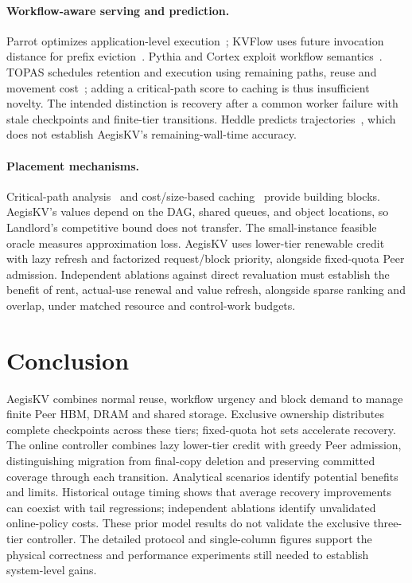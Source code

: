 \documentclass[sigplan,10pt,anonymous,nonacm]{acmart}
\begin{document}
\paragraph{Workflow-aware serving and prediction.}
Parrot optimizes application-level execution~\cite{lin2024parrot}; KVFlow
uses future invocation distance for prefix eviction~\cite{pan2025kvflow}.
Pythia and Cortex exploit workflow semantics~\cite{yu2026pythia,pagonas2025cortex}.
TOPAS schedules retention and execution using remaining paths, reuse and
movement cost~\cite{ni2026topas}; adding a critical-path score to caching
is thus insufficient novelty. The intended distinction is recovery after
a common worker failure with stale checkpoints and finite-tier transitions.
Heddle predicts trajectories~\cite{zhang2026heddle}, which does not establish
AegisKV's remaining-wall-time accuracy.

\paragraph{Placement mechanisms.}
Critical-path analysis~\cite{kelley1959cpm} and cost/size-based caching~\cite{young2002landlord}
provide building blocks. AegisKV's values depend on the DAG, shared queues,
and object locations, so Landlord's competitive bound does not transfer. The
small-instance feasible oracle measures approximation loss. AegisKV
uses lower-tier renewable credit with lazy refresh and factorized request/block
priority, alongside fixed-quota Peer admission. Independent ablations against
direct revaluation must establish the benefit of rent, actual-use renewal
and value refresh, alongside sparse ranking and overlap, under matched
resource and control-work budgets.

\section{Conclusion}
\label{sec:conclusion}

AegisKV combines normal reuse, workflow urgency and block demand to manage
finite Peer HBM, DRAM and shared storage. Exclusive ownership distributes
complete checkpoints across these tiers; fixed-quota hot sets accelerate
recovery. The online controller combines lazy lower-tier credit with greedy
Peer admission, distinguishing migration from final-copy deletion and
preserving committed coverage through each transition. Analytical
scenarios identify potential benefits and limits. Historical outage timing
shows that average recovery improvements can coexist with tail regressions;
independent ablations identify unvalidated online-policy costs. These
prior model results do not validate the exclusive three-tier controller. The detailed
protocol and single-column figures support the physical correctness and performance
experiments still needed to establish system-level gains.
\end{document}
